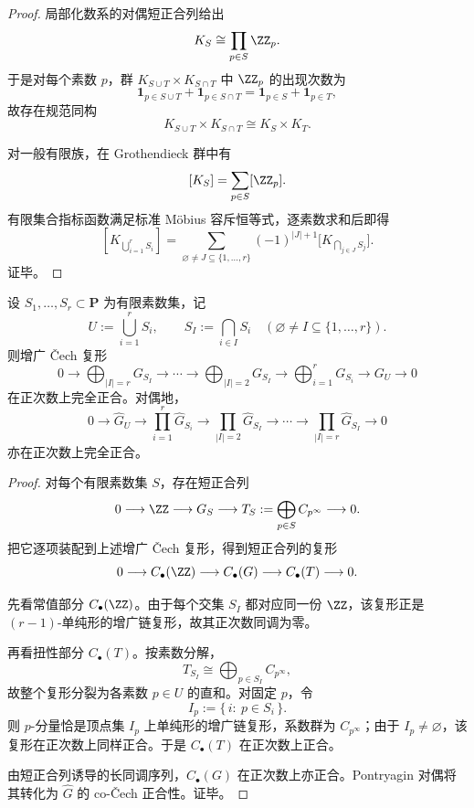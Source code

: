 \begin{proof}
局部化数系的对偶短正合列给出
\[
K_S\cong \prod_{p\in S}\ZZ_p.
\]
于是对每个素数 \(p\)，群 \(K_{S\cup T}\times K_{S\cap T}\) 中 \(\ZZ_p\) 的出现次数为
\[
\mathbf 1_{p\in S\cup T}+\mathbf 1_{p\in S\cap T}
=
\mathbf 1_{p\in S}+\mathbf 1_{p\in T},
\]
故存在规范同构
\[
K_{S\cup T}\times K_{S\cap T}\cong K_S\times K_T.
\]

对一般有限族，在 Grothendieck 群中有
\[
[K_S]=\sum_{p\in S}[\ZZ_p].
\]
有限集合指标函数满足标准 Möbius 容斥恒等式，逐素数求和后即得
\[
[K_{\bigcup_{i=1}^r S_i}]
=
\sum_{\varnothing\neq J\subseteq \{1,\dots,r\}}
(-1)^{|J|+1}
\bigl[K_{\bigcap_{j\in J} S_j}\bigr].
\]
证毕。
\end{proof}

\begin{theorem}\label{thm:conclusion-localized-cech-completeness-finite-cover}
设 \(S_1,\dots,S_r\subset \mathbf P\) 为有限素数集，记
\[
U:=\bigcup_{i=1}^r S_i,
\qquad
S_I:=\bigcap_{i\in I}S_i
\quad
(\varnothing\neq I\subseteq \{1,\dots,r\}).
\]
则增广 \v Cech 复形
\[
0\longrightarrow
\bigoplus_{|I|=r} G_{S_I}
\longrightarrow \cdots \longrightarrow
\bigoplus_{|I|=2} G_{S_I}
\longrightarrow
\bigoplus_{i=1}^r G_{S_i}
\longrightarrow
G_U
\longrightarrow 0
\]
在正次数上完全正合。对偶地，
\[
0\longrightarrow \widehat G_U
\longrightarrow \prod_{i=1}^r \widehat G_{S_i}
\longrightarrow \prod_{|I|=2}\widehat G_{S_I}
\longrightarrow \cdots \longrightarrow
\prod_{|I|=r}\widehat G_{S_I}
\longrightarrow 0
\]
亦在正次数上完全正合。
\end{theorem}

\begin{proof}
对每个有限素数集 \(S\)，存在短正合列
\[
0\longrightarrow \ZZ\longrightarrow G_S\longrightarrow
T_S:=\bigoplus_{p\in S} C_{p^\infty}\longrightarrow 0.
\]
把它逐项装配到上述增广 \v Cech 复形，得到短正合列的复形
\[
0\longrightarrow C_\bullet(\ZZ)\longrightarrow C_\bullet(G)\longrightarrow C_\bullet(T)\longrightarrow 0.
\]

先看常值部分 \(C_\bullet(\ZZ)\)。由于每个交集 \(S_I\) 都对应同一份 \(\ZZ\)，该复形正是 \((r-1)\)-单纯形的增广链复形，故其正次数同调为零。

再看扭性部分 \(C_\bullet(T)\)。按素数分解，
\[
T_{S_I}\cong \bigoplus_{p\in S_I} C_{p^\infty},
\]
故整个复形分裂为各素数 \(p\in U\) 的直和。对固定 \(p\)，令
\[
I_p:=\{\,i:\ p\in S_i\,\}.
\]
则 \(p\)-分量恰是顶点集 \(I_p\) 上单纯形的增广链复形，系数群为 \(C_{p^\infty}\)；由于 \(I_p\neq\varnothing\)，该复形在正次数上同样正合。于是 \(C_\bullet(T)\) 在正次数上正合。

由短正合列诱导的长同调序列，\(C_\bullet(G)\) 在正次数上亦正合。Pontryagin 对偶将其转化为 \(\widehat G\) 的 co-\v Cech 正合性。证毕。
\end{proof}

